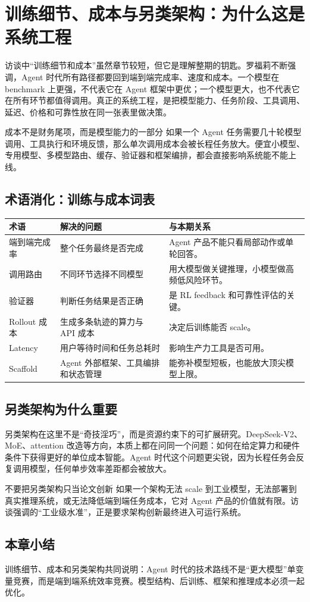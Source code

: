 \section{训练细节、成本与另类架构：为什么这是系统工程}

访谈中“训练细节和成本”虽然章节较短，但它是理解整期的钥匙。罗福莉不断强调，Agent 时代所有路径都要回到端到端完成率、速度和成本。一个模型在 benchmark 上更强，不代表它在 Agent 框架中更优；一个模型更大，也不代表它在所有环节都值得调用。真正的系统工程，是把模型能力、任务阶段、工具调用、延迟、价格和可靠性放在同一张表里做决策。

\begin{importantbox}{成本不是财务尾项，而是模型能力的一部分}
如果一个 Agent 任务需要几十轮模型调用、工具执行和环境反馈，那么单次调用成本会被长程任务放大。便宜小模型、专用模型、多模型路由、缓存、验证器和框架编排，都会直接影响系统能不能上线。
\end{importantbox}

\subsection{术语消化：训练与成本词表}

\noindent\begin{tabularx}{\textwidth}{p{}p{}X}
\toprule
术语 & 解决的问题 & 与本期关系 \\
\midrule
端到端完成率 & 整个任务最终是否完成 & Agent 产品不能只看局部动作或单轮回答。 \\
调用路由 & 不同环节选择不同模型 & 用大模型做关键推理，小模型做高频低风险环节。 \\
验证器 & 判断任务结果是否正确 & 是 RL feedback 和可靠性评估的关键。 \\
Rollout 成本 & 生成多条轨迹的算力与 API 成本 & 决定后训练能否 scale。 \\
Latency & 用户等待时间和任务总耗时 & 影响生产力工具是否可用。 \\
Scaffold & Agent 外部框架、工具编排和状态管理 & 能弥补模型短板，也能放大顶尖模型上限。 \\
\bottomrule
\end{tabularx}

\subsection{另类架构为什么重要}

另类架构在这里不是“奇技淫巧”，而是资源约束下的可扩展研究。DeepSeek-V2、MoE、attention 改造等方向，本质上都在问同一个问题：如何在给定算力和硬件条件下获得更好的单位成本智能。Agent 时代这个问题更尖锐，因为长程任务会反复调用模型，任何单步效率差距都会被放大。

\begin{warningbox}{不要把另类架构只当论文创新}
如果一个架构无法 scale 到工业模型，无法部署到真实推理系统，或无法降低端到端任务成本，它对 Agent 产品的价值就有限。访谈强调的“工业级水准”，正是要求架构创新最终进入可运行系统。
\end{warningbox}

\subsection{本章小结}

训练细节、成本和另类架构共同说明：Agent 时代的技术路线不是“更大模型”单变量竞赛，而是端到端系统效率竞赛。模型结构、后训练、框架和推理成本必须一起优化。

